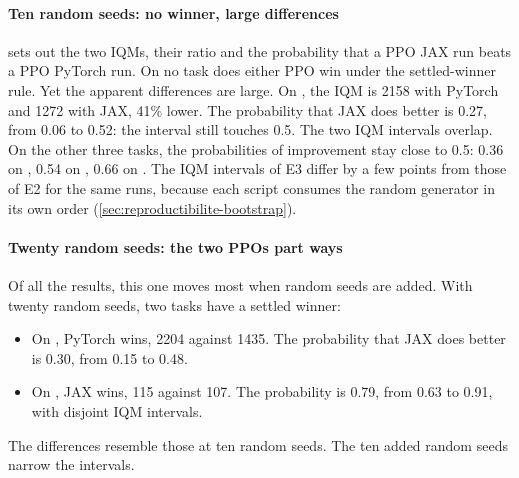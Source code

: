\paragraph{Ten random seeds: no winner, large differences}
 sets out the two IQMs, their ratio and the probability that a PPO JAX run beats a PPO PyTorch
run. On no task does either PPO win under the settled-winner rule. Yet the apparent differences are large. On
, the IQM is \num{2158} with PyTorch and \num{1272} with JAX, 41\% lower. The probability that
JAX does better is 0.27, from 0.06 to 0.52: the interval still touches 0.5. The two IQM intervals overlap. On
the other three tasks, the probabilities of improvement stay close to 0.5: 0.36 on , 0.54
on , 0.66 on . The IQM intervals of E3 differ by a few points from those of E2
for the same runs, because each script consumes the random generator in its own order
(\cref{sec:reproductibilite-bootstrap}).


\paragraph{Twenty random seeds: the two PPOs part ways}
Of all the results, this one moves most when random seeds are added. With twenty random seeds, two tasks have
a settled winner:
\begin{itemize}
  \item On , PyTorch wins, \num{2204} against \num{1435}. The probability that JAX does better
    is 0.30, from 0.15 to 0.48.
  \item On , JAX wins, 115 against 107. The probability is 0.79, from 0.63 to 0.91, with
    disjoint IQM intervals.
\end{itemize}
The differences resemble those at ten random seeds. The ten added random seeds narrow the intervals.

